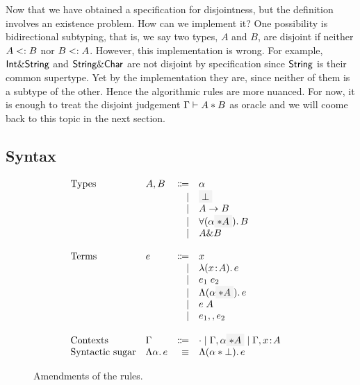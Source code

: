 Now that we have obtained a specification for disjointness, but the definition
involves an existence problem. How can we implement it? One possibility is
bidirectional subtyping, that is, we say two types, $A$ and $B$, are disjoint if
neither $A <: B$ nor $B <: A$. However, this implementation is
wrong. For example, $\textsf{Int} \& \textsf{String}$ and $\textsf{String} \& \textsf{Char}$ are
not disjoint by specification since $\textsf{String}$ is their common supertype. Yet
by the implementation they are, since neither of them is a subtype of
the other. 
Hence the algorithmic rules are more nuanced. For now, it is enough to treat the
disjoint judgement $\Gamma \vdash A * B$ as oracle and we will coome back to
this topic in the next section.


\subsection{Syntax}

\begin{figure}[h]
  \[
    \begin{array}{l}
      \begin{array}{llrll}
        \text{Types}
        & A, B & \Coloneqq & \alpha                  & \\
        &      & \mid & \highlight {$\bot$}          & \\
        &      & \mid & A \to B                      & \\
        &      & \mid & \for {(\alpha \highlight {$\disjoint A$})} B  & \\
        &      & \mid & A \inter B                   & \\

        \\
        \text{Terms}
        & e & \Coloneqq & x                        & \\
        &   & \mid & \lam {(x \hast A)} e          & \\
        &   & \mid & \app {e_1} {e_2}              & \\
        &   & \mid & \blam {(\alpha \highlight {$\disjoint A$})} e  & \\
        &   & \mid & \tapp e A                     & \\
        &   & \mid & e_1 \mergeop e_2              & \\

        \\
        \text{Contexts}
        & \Gamma & \Coloneqq & \cdot
                   \mid \Gamma, \alpha \highlight {$\disjoint A$}
                   \mid \Gamma, x \hast A  & \\

        \text{Syntactic sugar} & \blam {\alpha} e & \equiv & \blam {(\alpha \disjoint \bot)} e & \\
      \end{array}
    \end{array}
  \]

  \label{fig:syntax}
  \caption{Amendments of the rules.}
\end{figure}

